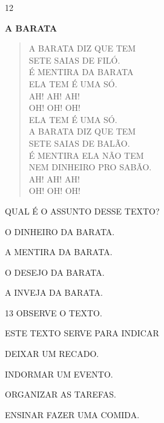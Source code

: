 \begin{escola}
{

\num{12}

\textbf{A BARATA}

\begin{verse}
A BARATA DIZ QUE TEM\\
SETE SAIAS DE FILÓ.\\
É MENTIRA DA BARATA\\
ELA TEM É UMA SÓ.\\
AH! AH! AH!\\
OH! OH! OH!\\
ELA TEM É UMA SÓ.\\
A BARATA DIZ QUE TEM\\
SETE SAIAS DE BALÃO.\\
É MENTIRA ELA NÃO TEM\\
NEM DINHEIRO PRO SABÃO.\\
AH! AH! AH!\\
OH! OH! OH!
\end{verse}


QUAL É O ASSUNTO DESSE TEXTO?

\begin{escolha}
\item O DINHEIRO DA BARATA.

\item A MENTIRA DA BARATA.

\item O DESEJO DA BARATA.

\item A INVEJA DA BARATA.
\end{escolha}


\num{13} OBSERVE O TEXTO.


ESTE TEXTO SERVE PARA INDICAR

\begin{escolha}
\item DEIXAR UM RECADO.

\item INDORMAR UM EVENTO.

\item ORGANIZAR AS TAREFAS.

\item ENSINAR FAZER UMA COMIDA.
\end{escolha}

}
\end{escola}
